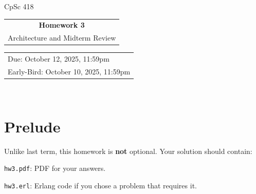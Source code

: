 \documentclass{article}
\begin{document}
\noindent%
CpSc 418 \hfill \begin{tabular}[t]{c}{\Large\bf Homework 3}\smallskip\\
  			Architecture and Midterm Review
		    \end{tabular}
	 \hfill \begin{tabular}[t]{l}Due: October 12, 2025, 11:59pm\\
	                             Early-Bird: October 10, 2025, 11:59pm
		\end{tabular}\bigskip\\
\par\noindent%
\section*{Prelude}
Unlike last term, this homework is \textbf{not} optional.
Your solution should contain:
\begin{description}
  \item{\texttt{hw3.pdf}}: PDF for your answers.
  \item{\texttt{hw3.erl}}: Erlang code if you chose a problem that requires it.
\end{description}
\end{document}
